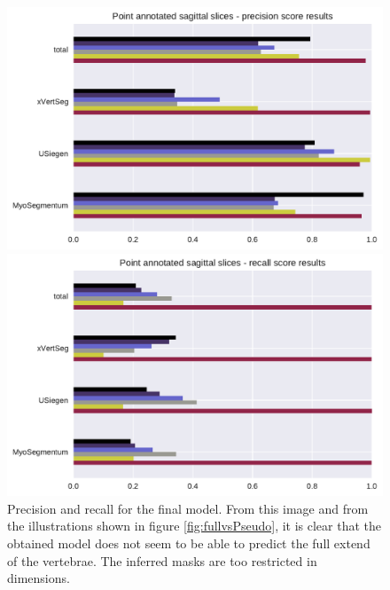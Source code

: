 \begin{figure}
    \centering
    \begin{minipage}{.80\textwidth}
        \includegraphics[width=.99\textwidth]{images/pointAnnotated_perClass_perSource_point_precision.pdf}
    \end{minipage} 
    \vspace{2 mm}
    \begin{minipage}{.80\textwidth}
        \includegraphics[width=.99\textwidth]{images/pointAnnotated_perClass_perSource_point_recall.pdf}
    \end{minipage} 
    \caption{Precision and recall for the final model. From this image and from the illustrations shown in figure \ref{fig:fullvsPseudo}, 
    it is clear that the obtained model does not seem to be able to predict the full extend of the vertebrae. The inferred masks are too restricted in dimensions.
    \protect
    }
\end{figure}

